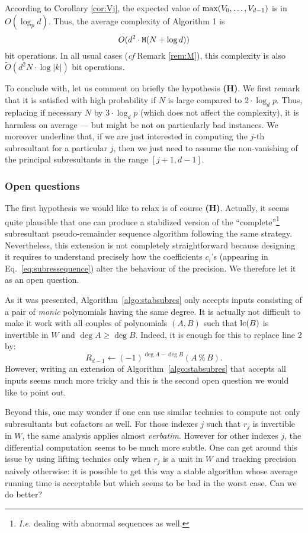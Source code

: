 \documentclass{jT}
\numberwithin{equation}{section}
\theoremstyle{definition}
\newcommand{\M}{\text{\tt M}}
\renewcommand{\max}{\text{\rm max}}
\newcommand{\lc}{\text{\rm lc}}
\newcommand{\A}{W}
\begin{document}
According to Corollary \ref{cor:Vj}, the expected value of 
$\max(V_0, \ldots, V_{d-1})$ is in $O(\log_p d)$. Thus, the average 
complexity of Algorithm 1 is $$O(d^2 \cdot \M(N + \log d))$$ bit 
operations. In all usual cases (\emph{cf} Remark \ref{rem:M}), this
complexity is also $\tilde O(d^2 N \cdot \log |k|)$ bit operations.

To conclude with, let us comment on briefly the hypothesis {\bf (H)}. We 
first remark that it is satisfied with high probability if $N$ is large 
compared to $2 \cdot \log_d p$. Thus, replacing if necessary $N$ by $3 
\cdot \log_d p$ (which does not affect the complexity), it is harmless
on average --- but might be not on particularly 
bad instances. We moreover underline that, if we are just interested in 
computing the $j$-th subresultant for a particular $j$, then we just 
need to assume the non-vanishing of the principal subresultants in the 
range $[j+1, d-1]$.

\subsubsection*{Open questions}
\label{subsec:questions}

The first hypothesis we would like to relax is of course {\bf (H)}. 
Actually, it seems quite plausible that one can produce a stabilized 
version of the ``complete''\footnote{\emph{I.e.} dealing with abnormal 
sequences as well.} subresultant pseudo-remainder sequence algorithm 
following the same strategy. Nevertheless, this extension is not 
completely straightforward because designing it requires to understand 
precisely how the coefficients $c_i$'s (appearing in 
Eq.~\ref{eq:subressequence}) alter the behaviour of the precision. We
therefore let it as an open question.

As it was presented, Algorithm~\ref{algo:stabsubres} only accepts inputs 
consisting of a pair of \emph{monic} polynomials having the same degree. 
It is actually not difficult to make it work with all couples of 
polynomials $(A,B)$ such that $\lc(B)$ is invertible in $\A$ and $\deg A 
\geq \deg B$. Indeed, it is enough for this to replace line 2 by:
$$R_{d-1} \leftarrow (-1)^{\deg A - \deg B} (A \,\%\, B).$$
However, writing an extension of Algorithm~\ref{algo:stabsubres} that 
accepts all inputs seems much more tricky and this is the second open
question we would like to point out.

Beyond this, one may wonder if one can use similar technics to compute 
not only subresultants but cofactors as well. For those indexes $j$ such 
that $r_j$ is invertible in $\A$, the same analysis applies almost 
\emph{verbatim}. However for other indexes $j$, the differential 
computation seems to be much more subtle. One can get around this issue 
by using lifting technics only when $r_j$ is a unit in $\A$ and tracking 
precision naively otherwise: it is possible to get this way a stable 
algorithm whose average running time is acceptable but which seems to be 
bad in the worst case. Can we do better?
\end{document}
